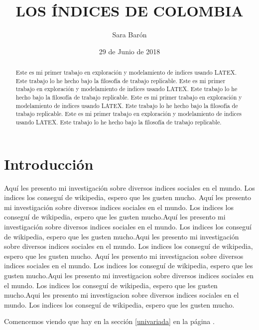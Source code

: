 \documentclass{article}
\title{LOS ÍNDICES DE COLOMBIA}
\author[1]{\normalsize Sara Barón}
\affil[1]{\small  Escuela de Ingeniería,Universidad de los Andes\\
\texttt{{sj.baron10}@uniandes.edu.co}}
\date{29 de Junio de 2018}
\begin{document}

\maketitle


\begin{abstract}
Este es mi primer trabajo en exploración y modelamiento de indices usando LATEX. Este trabajo lo he hecho bajo la filosofía de trabajo replicable. Este es mi primer trabajo en exploración y modelamiento de indices usando LATEX. Este trabajo lo he hecho bajo la filosofía de trabajo replicable. Este es mi primer trabajo en exploración y modelamiento de indices usando LATEX. Este trabajo lo he hecho bajo la filosofía de trabajo replicable. Este es mi primer trabajo en exploración y modelamiento de indices usando LATEX. Este trabajo lo he hecho bajo la filosofía de trabajo replicable.
\end{abstract}

\section*{Introducción}

Aquí les presento mi investigación sobre diversos indices sociales en el mundo. Los indices los conseguí de wikipedia, espero que les gusten mucho. Aquí les presento mi investigación sobre diversos indices sociales en el mundo. Los indices los conseguí de wikipedia, espero que les gusten mucho.Aquí les presento mi investigación sobre diversos indices sociales en el mundo. Los indices los conseguí de wikipedia, espero que les gusten mucho.Aqui les presento mi investigación sobre diversos indices sociales en el mundo. Los indices los conseguí de wikipedia, espero que les gusten mucho.
Aquí les presento mi investigacion sobre diversos indices sociales en el mundo. Los indices los conseguí de wikipedia, espero que les gusten mucho.Aqui les presento mi investigacion sobre diversos indices sociales en el mundo. Los indices los conseguí de wikipedia, espero que les gusten mucho.Aqui les presento mi investigacion sobre diversos indices sociales en el mundo. Los indices los conseguí de wikipedia, espero que les gusten mucho.






Comencemos viendo que hay en la sección \ref{univariada} en la página \pageref{univariada}.

\clearpage
\end{document}

